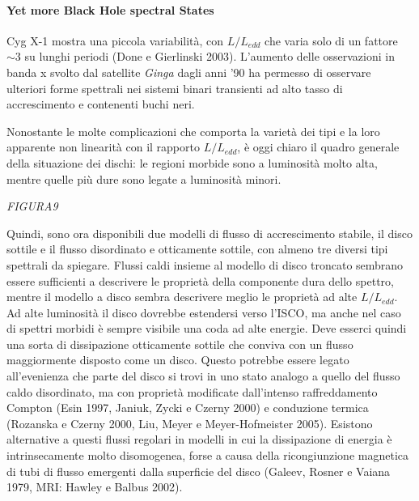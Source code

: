 \documentclass[a4paperbi]{article}
\begin{document}
\paragraph{Yet more Black Hole spectral States}

	Cyg X-1 mostra una piccola variabilità, con $L/L_{edd}$ che varia solo di un fattore $\sim3$ su lunghi periodi (Done e Gierlinski 2003). L'aumento delle osservazioni in banda x svolto dal satellite \textit{Ginga} dagli anni '90 ha permesso di osservare ulteriori forme spettrali nei sistemi binari transienti ad alto tasso di accrescimento e contenenti buchi neri.
	
	Nonostante le molte complicazioni che comporta la varietà dei tipi e la loro apparente non linearità con il rapporto $L/L_{edd}$, è oggi chiaro il quadro generale della situazione dei dischi: le regioni morbide sono a luminosità molto alta, mentre quelle più dure sono legate a luminosità minori.

	\emph{FIGURA9}	
	
	Quindi, sono ora disponibili due modelli di flusso di accrescimento stabile, il disco sottile e il flusso disordinato e otticamente sottile, con almeno tre diversi tipi spettrali da spiegare. Flussi caldi insieme al modello di disco troncato sembrano essere sufficienti a descrivere le proprietà della componente dura dello spettro, mentre il modello a disco sembra descrivere meglio le proprietà ad alte $L/L_{edd}$. Ad alte luminosità il disco dovrebbe estendersi verso l'ISCO, ma anche nel caso di spettri morbidi è sempre	visibile una coda ad alte energie. Deve esserci quindi una sorta di dissipazione otticamente sottile che conviva con un flusso maggiormente disposto come un disco. Questo potrebbe essere legato all'evenienza che parte del disco si trovi in uno stato analogo a quello del flusso caldo disordinato, ma con proprietà modificate dall'intenso raffreddamento Compton (Esin 1997, Janiuk, Zycki e Czerny 2000) e conduzione termica (Rozanska e Czerny 2000, Liu, Meyer e Meyer-Hofmeister 2005). Esistono alternative a questi flussi regolari in modelli in cui la dissipazione di energia è intrinsecamente molto disomogenea, forse a causa della ricongiunzione magnetica di tubi di flusso emergenti dalla superficie del disco (Galeev, Rosner e Vaiana 1979, MRI: Hawley e Balbus 2002).
	
\end{document}
